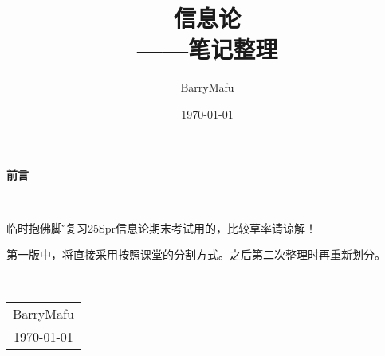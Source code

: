 \documentclass[12pt, a4paper, oneside]{ctexbook}
\title{{\Huge{\textbf{信息论}}}\\——笔记整理}
\author{BarryMafu}
\date{\today}
\begin{document}
\maketitle

\setcounter{page}{1}

\begin{center}
    \Huge\textbf{前言}
\end{center}~\

临时抱佛脚\~，复习25Spr信息论期末考试用的，比较草率请谅解！

第一版中，将直接采用按照课堂的分割方式。之后第二次整理时再重新划分。

~\\
\begin{flushright}
    \begin{tabular}{c}
        BarryMafu\\
        \today
    \end{tabular}
\end{flushright}

\newpage
{}
\setcounter{page}{1}
\tableofcontents
\newpage
\setcounter{page}{1}















\end{document}
